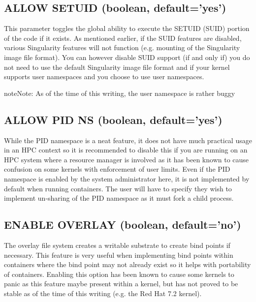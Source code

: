 \documentclass[letterpaper,10pt,english]{sphinxmanual}
\begin{document}
\subsection{ALLOW SETUID (boolean, default=’yes’)}
\label{\detokenize{the_singularity_config_file:allow-setuid-boolean-default-yes}}
This parameter toggles the global ability to execute the SETUID (SUID)
portion of the code if it exists. As mentioned earlier, if the SUID
features are disabled, various Singularity features will not function
(e.g. mounting of the Singularity image file format).
You can however disable SUID support  (if and only if) you do
not need to use the default Singularity image file format and if your
kernel supports user namespaces and you choose to use user namespaces.

\begin{sphinxadmonition}{note}{Note:}
As of the time of this writing, the user namespace is rather
buggy
\end{sphinxadmonition}


\subsection{ALLOW PID NS (boolean, default=’yes’)}
\label{\detokenize{the_singularity_config_file:allow-pid-ns-boolean-default-yes}}
While the PID namespace is a neat feature, it does not have much
practical usage in an HPC context so it is recommended to disable this
if you are running on an HPC system where a resource manager is
involved as it has been known to cause confusion on some kernels with
enforcement of user limits.
Even if the PID namespace is enabled by the system administrator here,
it is not implemented by default when running containers. The user
will have to specify they wish to implement un-sharing of the PID
namespace as it must fork a child process.


\subsection{ENABLE OVERLAY (boolean, default=’no’)}
\label{\detokenize{the_singularity_config_file:enable-overlay-boolean-default-no}}
The overlay file system creates a writable substrate to create bind
points if necessary. This feature is very useful when implementing bind
points within containers where the bind point may not already exist so
it helps with portability of containers. Enabling this option has been
known to cause some kernels to panic as this feature maybe present
within a kernel, but has not proved to be stable as of the time of this
writing (e.g. the Red Hat 7.2 kernel).
\end{document}
